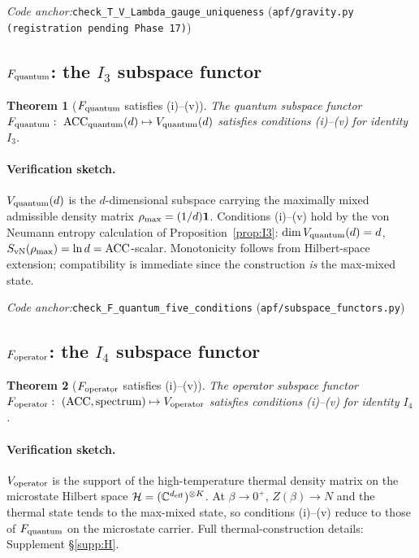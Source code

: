 \documentclass[11pt]{article}
\theoremstyle{plain}
\newtheorem{theorem}{Theorem}[section]
\theoremstyle{definition}
\theoremstyle{remark}
\newcommand{\coderef}[2]{\par\noindent\textit{Code anchor:}\quad\texttt{#1} (\texttt{#2})}
\begin{document}
\coderef{check\_T\_V\_Lambda\_gauge\_uniqueness}{apf/gravity.py (registration pending Phase 17)}

\bigskip

\subsection{\texorpdfstring{$F_{\rm quantum}$}{F\_quantum}: the \texorpdfstring{$I_3$}{I3} subspace functor}\label{supp:E4}

\begin{theorem}[$F_{\rm quantum}$ satisfies (i)--(v)]\label{thm:F_quantum}
The quantum subspace functor $F_{\rm quantum} :\ \mathrm{ACC}_{\rm quantum}(d) \mapsto V_{\rm quantum}(d)$ satisfies conditions (i)--(v) for identity $I_3$.
\end{theorem}

\paragraph{Verification sketch.}  $V_{\rm quantum}(d)$ is the $d$-dimensional subspace carrying the maximally mixed admissible density matrix $\rho_{\rm max} = (1/d)\mathbf{1}$.  Conditions (i)--(v) hold by the von Neumann entropy calculation of Proposition~\ref{prop:I3}: $\dim V_{\rm quantum}(d) = d$, $S_{\rm vN}(\rho_{\rm max}) = \ln d = \mathrm{ACC}$-scalar.  Monotonicity follows from Hilbert-space extension; compatibility is immediate since the construction \emph{is} the max-mixed state.

\coderef{check\_F\_quantum\_five\_conditions}{apf/subspace\_functors.py}

\bigskip

\subsection{\texorpdfstring{$F_{\rm operator}$}{F\_operator}: the \texorpdfstring{$I_4$}{I4} subspace functor}\label{supp:E5}

\begin{theorem}[$F_{\rm operator}$ satisfies (i)--(v)]\label{thm:F_operator}
The operator subspace functor $F_{\rm operator} :\ (\mathrm{ACC}, \text{spectrum}) \mapsto V_{\rm operator}$ satisfies conditions (i)--(v) for identity $I_4$.
\end{theorem}

\paragraph{Verification sketch.}  $V_{\rm operator}$ is the support of the high-temperature thermal density matrix on the microstate Hilbert space $\mathcal{H} = (\mathbb{C}^{d_{\rm eff}})^{\otimes K}$.  At $\beta \to 0^+$, $Z(\beta) \to N$ and the thermal state tends to the max-mixed state, so conditions (i)--(v) reduce to those of $F_{\rm quantum}$ on the microstate carrier.  Full thermal-construction details: Supplement \S\ref{supp:H}.
\end{document}
